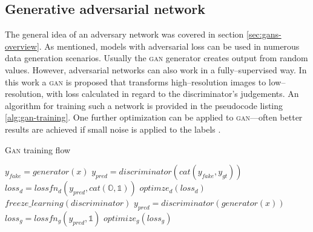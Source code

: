 \subsection{Generative adversarial network}
The general idea of an adversary network was covered in section \ref{sec:gans-overview}.
As mentioned, models with adversarial loss can be used in numerous data generation scenarios.
Usually the \textsc{gan} generator creates output from random values.
However, adversarial networks can also work in a fully--supervised way.
In this work a \textsc{gan} is proposed that transforms high--resolution images to low--resolution, with loss calculated in regard to the discriminator's judgements.
An algorithm for training such a network is provided in the pseudocode listing \ref{alg:gan-training}.
One further optimization can be applied to \textsc{gan}---often better results are achieved if small noise is applied to the labels \cite{sonderby-2016-gannoise}.
\begin{algorithm}
\caption{\textsc{Gan} training flow}
\label{alg:gan-training}
\begin{algorithmic}
	\STATE $ y_{fake} = generator(x) $
	\STATE $ y_{pred} = discriminator(cat(y_{fake}, y_{gt})) $
	\STATE $ loss_d = lossfn_d(y_{pred}, cat(\mathds{O}, \mathds{1})) $
	\STATE $ optimze_d(loss_d) $
	\STATE $ freeze\_learning(discriminator) $
	\STATE $ y_{pred} = discriminator(generator(x)) $
	\STATE $ loss_g = lossfn_g(y_{pred}, \mathds{1}) $
	\STATE $ optimize_g(loss_g) $
\end{algorithmic}
\end{algorithm}

